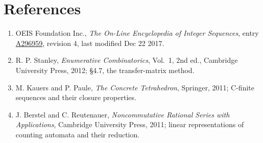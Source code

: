 \documentclass[11pt]{article}
\theoremstyle{definition}
\begin{document}
\section{References}

\begin{enumerate}

\item OEIS Foundation Inc., \emph{The On-Line Encyclopedia of Integer Sequences}, entry \href{https://oeis.org/A296959}{A296959}, revision 4, last modified Dec 22 2017.

\item R. P. Stanley, \emph{Enumerative Combinatorics}, Vol.~1, 2nd ed., Cambridge University Press, 2012; \S4.7, the transfer-matrix method.

\item M. Kauers and P. Paule, \emph{The Concrete Tetrahedron}, Springer, 2011; C-finite sequences and their closure properties.

\item J. Berstel and C. Reutenauer, \emph{Noncommutative Rational Series with Applications}, Cambridge University Press, 2011; linear representations of counting automata and their reduction.

\end{enumerate}
\end{document}
